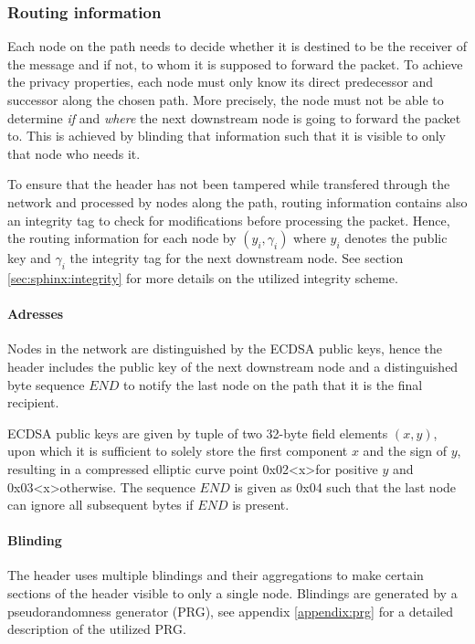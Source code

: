 \subsubsection{Routing information}
\label{sec:sphinx:routinginformation}

Each node on the path needs to decide whether it is destined to be the receiver of the message and if not, to whom it is supposed to forward the packet. To achieve the privacy properties, each node must only know its direct predecessor and successor along the chosen path. More precisely, the node must not be able to determine \textit{if} and \textit{where} the next downstream node is going to forward the packet to. This is achieved by blinding that information such that it is visible to only that node who needs it.

To ensure that the header has not been tampered while transfered through the network and processed by nodes along the path, routing information contains also an integrity tag to check for modifications before processing the packet. Hence, the routing information for each node by $(y_i, \gamma_i)$ where $y_i$ denotes the public key and $\gamma_i$ the integrity tag for the next downstream node. See section \ref{sec:sphinx:integrity} for more details on the utilized integrity scheme.

\paragraph{Adresses}

Nodes in the network are distinguished by the ECDSA public keys, hence the header includes the public key of the next downstream node and a distinguished byte sequence $END$ to notify the last node on the path that it is the final recipient.

ECDSA public keys are given by tuple of two 32-byte field elements $(x,y)$, upon which it is sufficient to solely store the first component $x$ and the sign of $y$, resulting in a \textsf{compressed} elliptic curve point \textsf{0x02}\textless\textsf{x}\textgreater for positive $y$ and \textsf{0x03}\textless\textsf{x}\textgreater otherwise. The sequence $END$ is given as \textsf{0x04} such that the last node can ignore all subsequent bytes if $END$ is present.

\paragraph{Blinding}

The header uses multiple blindings and their aggregations to make certain sections of the header visible to only a single node. Blindings are generated by a pseudorandomness generator (PRG), see appendix \ref{appendix:prg} for a detailed description of the utilized PRG.

